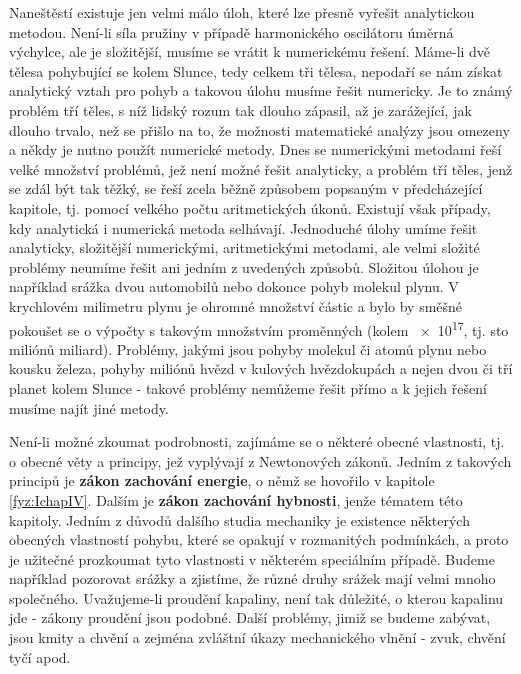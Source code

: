     Naneštěstí existuje jen velmi málo úloh, které lze přesně vyřešit analytickou metodou. Není-li 
    síla pružiny v případě harmonického oscilátoru úměrná výchylce, ale je složitější, musíme se 
    vrátit k numerickému řešení. Máme-li dvě tělesa pohybující se kolem Slunce, tedy celkem tři 
    tělesa, nepodaří se nám získat analytický vztah pro pohyb a takovou úlohu musíme řešit 
    numericky. Je to známý problém tří těles, s níž lidský rozum tak dlouho zápasil, až je 
    zarážející, jak dlouho trvalo, než se přišlo na to, že možnosti matematické analýzy jsou 
    omezeny a někdy je nutno použít numerické metody. Dnes se numerickými metodami řeší velké 
    množství problémů, jež není možné řešit analyticky, a problém tří těles, jenž se zdál být tak 
    těžký, se řeší zcela běžně způsobem popsaným v předcházející kapitole, tj. pomocí velkého počtu 
    aritmetických úkonů. Existují však případy, kdy analytická i numerická metoda selhávají. 
    Jednoduché úlohy umíme řešit analyticky, složitější numerickými, aritmetickými metodami, ale 
    velmi složité problémy neumíme řešit ani jedním z uvedených způsobů. Složitou úlohou je 
    například srážka dvou automobilů nebo dokonce pohyb molekul plynu. V krychlovém milimetru 
    plynu je ohromné množství částic a bylo by směšné pokoušet se o výpočty s takovým množstvím 
    proměnných (kolem \num{e17}, tj. sto miliónů miliard). Problémy, jakými jsou pohyby molekul či 
    atomů plynu nebo kousku železa, pohyby miliónů hvězd v kulových hvězdokupách a nejen dvou či 
    tří planet kolem Slunce - takové problémy nemůžeme řešit přímo a k jejich řešení musíme najít 
    jiné metody.
    
    Není-li možné zkoumat podrobnosti, zajímáme se o některé obecné vlastnosti, tj. o obecné věty 
    a principy, jež vyplývají z Newtonových zákonů. Jedním z takových principů je \textbf{zákon 
    zachování energie}, o němž se hovořilo v kapitole \ref{fyz:IchapIV}. Dalším je \textbf{zákon 
    zachování hybnosti}, jenže tématem této kapitoly. Jedním z důvodů dalšího studia mechaniky je 
    existence některých obecných vlastností pohybu, které se opakují v rozmanitých podmínkách, a 
    proto je užitečné prozkoumat tyto vlastnosti v některém speciálním případě. Budeme například 
    pozorovat srážky a zjistíme, že různé druhy srážek mají velmi mnoho společného. Uvažujeme-li 
    proudění kapaliny, není tak důležité, o kterou kapalinu jde - zákony proudění jsou podobné. 
    Další problémy, jimiž se budeme zabývat, jsou kmity a chvění a zejména zvláštní úkazy 
    mechanického vlnění - zvuk, chvění tyčí apod.
    

